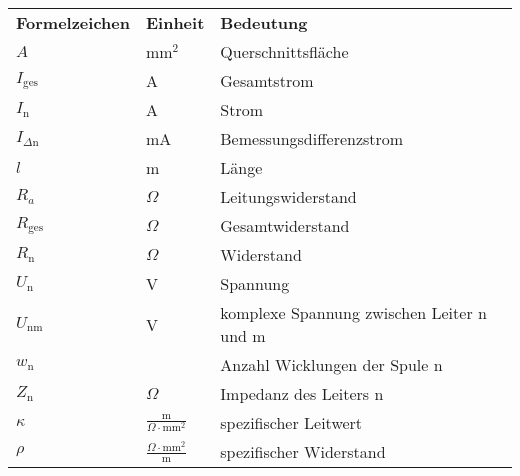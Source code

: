 \begin{table}[hbt]	
	
	\renewcommand{\arraystretch}{2}
	\begin{tabular}{p{4cm}p{3cm}l}
		\textbf{Formelzeichen} & \textbf{Einheit} & \textbf{Bedeutung}\\
	
        $A$ & mm$^2$ & Querschnittsfläche\\
		$I_{\text{ges}}$ & A & Gesamtstrom \\
        $I_\text{n}$ & A & Strom \\
        $I_{\Delta\text{n}}$ & mA & Bemessungsdifferenzstrom\\
        $l$ & m & Länge\\
        $R_a$ & $\Omega$ & Leitungswiderstand\\
		$R_{\text{ges}}$ & $\Omega$ & Gesamtwiderstand \\
        $R_\text{n}$ & $\Omega$ & Widerstand \\
        $U_\text{n}$ & V & Spannung \\
        $U_\text{nm}$ & V & komplexe Spannung zwischen Leiter n und m\\
        $w_\text{n}$ & & Anzahl Wicklungen der Spule n\\
        $Z_\text{n}$ & $\Omega$ & Impedanz des Leiters n\\

        $\kappa$ & $\frac{\text{m}}{\Omega \cdot \text{mm}^2}$ & spezifischer Leitwert\\
        $\rho$ & $\frac{\Omega \cdot \text{mm}^2}{\text{m}}$ & spezifischer Widerstand\\
        
	\end{tabular} 
\end{table}